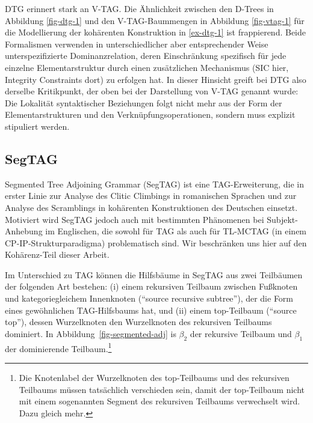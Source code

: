 DTG erinnert stark an V-TAG. Die Ähnlichkeit zwischen den D-Trees in Abbildung \ref{fig-dtg-1} und den V-TAG-Baummengen in Abbildung \ref{fig-vtag-1} für die Modellierung der kohärenten Konstruktion in \ref{ex-dtg-1} ist frappierend. Beide Formalismen verwenden in unterschiedlicher aber entsprechender Weise unterspezifizierte Dominanzrelation, deren Einschränkung spezifisch für jede einzelne Elementarstruktur durch einen zusätzlichen Mechanismus (SIC hier, Integrity Constraints dort) zu erfolgen hat. In dieser Hinsicht greift bei DTG also derselbe Kritikpunkt, der oben bei der Darstellung von V-TAG genannt wurde: Die Lokalität syntaktischer Beziehungen folgt nicht mehr aus der Form der Elementarstrukturen und den Verknüpfungsoperationen, sondern muss explizit stipuliert werden.  


\subsection{SegTAG}

Segmented Tree Adjoining Grammar (SegTAG) ist eine TAG-Erweiterung, die \cite{Kulick:00} in erster Linie zur Analyse des Clitic Climbings in romanischen Sprachen und zur Analyse des Scramblings in kohärenten Konstruktionen des Deutschen einsetzt. Motiviert wird SegTAG jedoch auch mit bestimmten Phänomenen bei Subjekt-Anhebung im Englischen, die sowohl für TAG als auch für TL-MCTAG (in einem CP-IP-Strukturparadigma) problematisch sind. Wir beschränken uns hier auf den Kohärenz-Teil dieser Arbeit.

Im Unterschied zu TAG können die Hilfsbäume in SegTAG aus zwei Teilbäumen der folgenden Art bestehen: (i) einem rekursiven Teilbaum zwischen Fu\ss knoten und kategoriegleichem Innenknoten ("`source recursive subtree"'), der die Form eines gewöhnlichen TAG-Hilfs\-baums hat, und (ii) einem top-Teilbaum ("`source top"'), dessen Wurzelknoten den Wurzelknoten des rekursiven Teilbaums dominiert. In Abbildung~\ref{fig-segmented-adj} is $\beta_2$ der rekursive Teilbaum und $\beta_1$ der dominierende Teilbaum.\footnote{Die Knotenlabel der Wurzelknoten des top-Teilbaums und des rekursiven Teilbaums müssen tatsächlich verschieden sein, damit der top-Teilbaum nicht mit einem sogenannten Segment des rekursiven Teilbaums verwechselt wird. Dazu gleich mehr.}  

